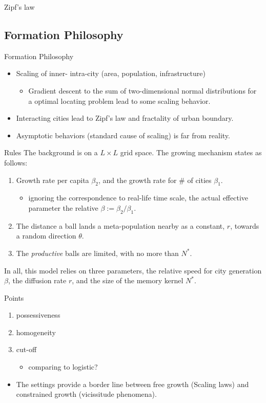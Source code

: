 \documentclass{beamer}
\begin{document}
\begin{frame}{Zipf's law}
\subsection{Formation Philosophy}
\begin{frame}{Formation Philosophy}
  \begin{itemize}
    \item Scaling of inner- intra-city (area, population, infrastructure)
    \begin{itemize}
      \item Gradient descent to the sum of two-dimensional normal distributions for a optimal locating problem lead to some scaling behavior.
    \end{itemize}
    \item Interacting cities lead to Zipf's law and fractality of urban boundary.
    \item Asymptotic behaviors (standard cause of scaling) is far from reality.
  \end{itemize}
\end{frame}

\begin{frame}{Rules}
  The background is on a $L\times L$ grid space. The growing mechanism states as follows:
  \begin{enumerate}
    \item Growth rate per capita $\beta_2$, and the growth rate for \# of cities $\beta_1$.
    \begin{itemize}
      \item ignoring the correspondence to real-life time scale, the actual effective parameter the relative $\beta:=\beta_2/\beta_1$.
    \end{itemize}
    \item The distance a ball lands a meta-population nearby as a constant, $r$, towards a random direction $\theta$.
    \item The \emph{productive} balls are limited, with no more than $N^*$.
  \end{enumerate}
  \vspace{0.5cm}
  In all, this model relies on three parameters, the relative speed for city generation $\beta$, the diffusion rate $r$, and the size of the memory kernel $N^*$.
\end{frame}

\begin{frame}{Points}
  \begin{enumerate}
    \item possessiveness
    \item homogeneity
    \item cut-off
    \begin{itemize}
    \item comparing to logistic?
    \end{itemize}
  \end{enumerate}
  \vspace{1cm}
  \begin{itemize}
    \item The settings provide a border line between free growth (Scaling laws) and constrained growth (vicissitude phenomena).
  \end{itemize}


\end{frame}
\end{frame}
\end{document}
